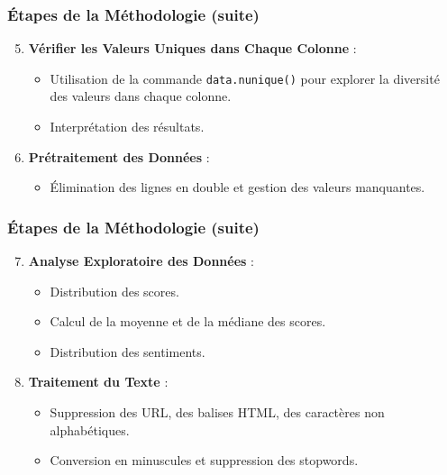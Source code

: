 \begin{frame}
    \frametitle{Étapes de la Méthodologie (suite)}

    \begin{enumerate}
        \setcounter{enumi}{4}
        \item \textbf{Vérifier les Valeurs Uniques dans Chaque Colonne} :
            \begin{itemize}
                \item Utilisation de la commande \texttt{data.nunique()} pour explorer la diversité des valeurs dans chaque colonne.
                \item Interprétation des résultats.
            \end{itemize}
        \item \textbf{Prétraitement des Données} :
            \begin{itemize}
                \item Élimination des lignes en double et gestion des valeurs manquantes.
            \end{itemize}
    \end{enumerate}
\end{frame}

\begin{frame}
    \frametitle{Étapes de la Méthodologie (suite)}

    \begin{enumerate}
        \setcounter{enumi}{6}
        \item \textbf{Analyse Exploratoire des Données} :
            \begin{itemize}
                \item Distribution des scores.
                \item Calcul de la moyenne et de la médiane des scores.
                \item Distribution des sentiments.
            \end{itemize}
        \item \textbf{Traitement du Texte} :
            \begin{itemize}
                \item Suppression des URL, des balises HTML, des caractères non alphabétiques.
                \item Conversion en minuscules et suppression des stopwords.
            \end{itemize}
    \end{enumerate}
\end{frame}

